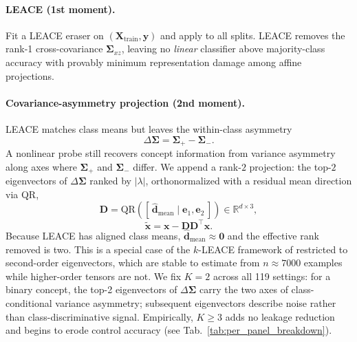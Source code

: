 \paragraph{LEACE (1st moment).}
Fit a LEACE eraser \citep{belrose-etal-2023-leace} on $(\mathbf{X}_{\text{train}}, \mathbf{y})$ and apply to all splits. LEACE removes the rank-1 cross-covariance $\mathbf{\Sigma}_{xz}$, leaving no \emph{linear} classifier above majority-class accuracy with provably minimum representation damage among affine projections.

\paragraph{Covariance-asymmetry projection (2nd moment).}
LEACE matches class means but leaves the within-class asymmetry
\begin{equation}
\label{eq:delta_sigma}
\Delta\mathbf{\Sigma} = \mathbf{\Sigma}_{+} - \mathbf{\Sigma}_{-}.
\end{equation}
A nonlinear probe still recovers concept information from variance asymmetry along axes where $\mathbf{\Sigma}_{+}$ and $\mathbf{\Sigma}_{-}$ differ. We append a rank-$2$ projection: the top-$2$ eigenvectors of $\Delta\mathbf{\Sigma}$ ranked by $|\lambda|$, orthonormalized with a residual mean direction via QR,
\begin{equation}
\label{eq:covmatch_basis}
\mathbf{D} = \mathrm{QR}\!\left([\,\hat{\mathbf{d}}_{\text{mean}} \;\big|\; \mathbf{e}_1, \mathbf{e}_2\,]\right) \in \mathbb{R}^{d \times 3},
\end{equation}
\begin{equation}
\label{eq:covmatch_apply}
\tilde{\mathbf{x}} = \mathbf{x} - \mathbf{D}\mathbf{D}^\top \mathbf{x}.
\end{equation}
Because LEACE has aligned class means, $\hat{\mathbf{d}}_{\text{mean}} \approx \mathbf{0}$ and the effective rank removed is two. This is a special case of the $k$-LEACE framework of \citet{singh-ravfogel-2024-representation-surgery} restricted to second-order eigenvectors, which are stable to estimate from $n \approx 7000$ examples while higher-order tensors are not. We fix $K{=}2$ across all 119 settings: for a binary concept, the top-2 eigenvectors of $\Delta\mathbf{\Sigma}$ carry the two axes of class-conditional variance asymmetry; subsequent eigenvectors describe noise rather than class-discriminative signal. Empirically, $K{\ge}3$ adds no leakage reduction and begins to erode control accuracy (see Tab.~\ref{tab:per_panel_breakdown}).

